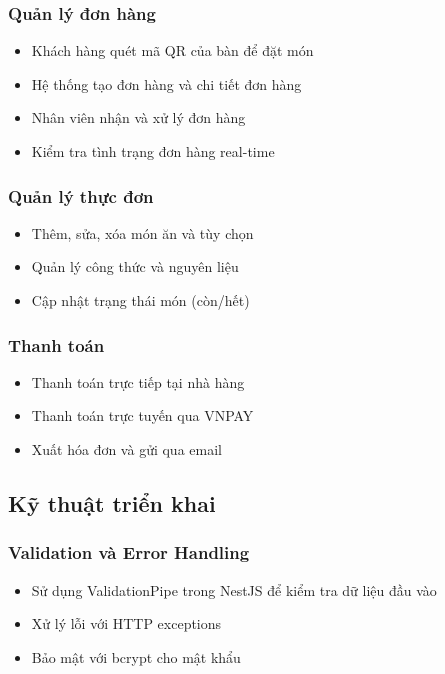 \documentclass[a4paper]{article}
\begin{document}
        \subsubsection{Quản lý đơn hàng}
        \begin{itemize}
            \item Khách hàng quét mã QR của bàn để đặt món
            \item Hệ thống tạo đơn hàng và chi tiết đơn hàng
            \item Nhân viên nhận và xử lý đơn hàng
            \item Kiểm tra tình trạng đơn hàng real-time
        \end{itemize}
        
        \subsubsection{Quản lý thực đơn}
        \begin{itemize}
            \item Thêm, sửa, xóa món ăn và tùy chọn
            \item Quản lý công thức và nguyên liệu
            \item Cập nhật trạng thái món (còn/hết)
        \end{itemize}
        
        \subsubsection{Thanh toán}
        \begin{itemize}
            \item Thanh toán trực tiếp tại nhà hàng
            \item Thanh toán trực tuyến qua VNPAY
            \item Xuất hóa đơn và gửi qua email
        \end{itemize}

    \subsection{Kỹ thuật triển khai}
        \subsubsection{Validation và Error Handling}
        \begin{itemize}
            \item Sử dụng ValidationPipe trong NestJS để kiểm tra dữ liệu đầu vào
            \item Xử lý lỗi với HTTP exceptions
            \item Bảo mật với bcrypt cho mật khẩu
        \end{itemize}
        
\end{document}

